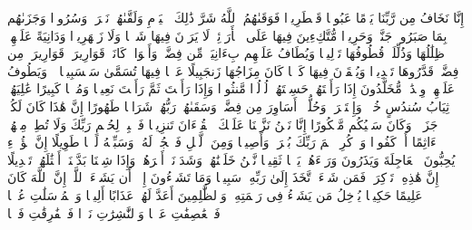 \startbuffer[\q:76:10]
إِنَّا نَخَافُ مِن رَّبِّنَا یَوۡمًا عَبُوسࣰا قَمۡطَرِیرࣰا%
\stopbuffer%
\startbuffer[\q:76:11]
فَوَقَىٰهُمُ ٱللَّهُ شَرَّ ذَٰلِكَ ٱلۡیَوۡمِ وَلَقَّىٰهُمۡ نَضۡرَةࣰ وَسُرُورࣰا%
\stopbuffer%
\startbuffer[\q:76:12]
وَجَزَىٰهُم بِمَا صَبَرُوا۟ جَنَّةࣰ وَحَرِیرࣰا%
\stopbuffer%
\startbuffer[\q:76:13]
مُّتَّكِءِینَ فِیهَا عَلَى ٱلۡأَرَاۤئِكِۖ لَا یَرَوۡنَ فِیهَا شَمۡسࣰا وَلَا زَمۡهَرِیرࣰا%
\stopbuffer%
\startbuffer[\q:76:14]
وَدَانِیَةً عَلَیۡهِمۡ ظِلَٰلُهَا وَذُلِّلَتۡ قُطُوفُهَا تَذۡلِیلࣰا%
\stopbuffer%
\startbuffer[\q:76:15]
وَیُطَافُ عَلَیۡهِم بِءَانِیَةࣲ مِّن فِضَّةࣲ وَأَكۡوَابࣲ كَانَتۡ قَوَارِیرَا۠%
\stopbuffer%
\startbuffer[\q:76:16]
قَوَارِیرَا۟ مِن فِضَّةࣲ قَدَّرُوهَا تَقۡدِیرࣰا%
\stopbuffer%
\startbuffer[\q:76:17]
وَیُسۡقَوۡنَ فِیهَا كَأۡسࣰا كَانَ مِزَاجُهَا زَنجَبِیلًا%
\stopbuffer%
\startbuffer[\q:76:18]
عَیۡنࣰا فِیهَا تُسَمَّىٰ سَلۡسَبِیلࣰا%
\stopbuffer%
\startbuffer[\q:76:19]
۞ وَیَطُوفُ عَلَیۡهِمۡ وِلۡدَٰنࣱ مُّخَلَّدُونَ إِذَا رَأَیۡتَهُمۡ حَسِبۡتَهُمۡ لُؤۡلُؤࣰا مَّنثُورࣰا%
\stopbuffer%
\startbuffer[\q:76:20]
وَإِذَا رَأَیۡتَ ثَمَّ رَأَیۡتَ نَعِیمࣰا وَمُلۡكࣰا كَبِیرًا%
\stopbuffer%
\startbuffer[\q:76:21]
عَٰلِیَهُمۡ ثِیَابُ سُندُسٍ خُضۡرࣱ وَإِسۡتَبۡرَقࣱۖ وَحُلُّوۤا۟ أَسَاوِرَ مِن فِضَّةࣲ وَسَقَىٰهُمۡ رَبُّهُمۡ شَرَابࣰا طَهُورًا%
\stopbuffer%
\startbuffer[\q:76:22]
إِنَّ هَٰذَا كَانَ لَكُمۡ جَزَاۤءࣰ وَكَانَ سَعۡیُكُم مَّشۡكُورًا%
\stopbuffer%
\startbuffer[\q:76:23]
إِنَّا نَحۡنُ نَزَّلۡنَا عَلَیۡكَ ٱلۡقُرۡءَانَ تَنزِیلࣰا%
\stopbuffer%
\startbuffer[\q:76:24]
فَٱصۡبِرۡ لِحُكۡمِ رَبِّكَ وَلَا تُطِعۡ مِنۡهُمۡ ءَاثِمًا أَوۡ كَفُورࣰا%
\stopbuffer%
\startbuffer[\q:76:25]
وَٱذۡكُرِ ٱسۡمَ رَبِّكَ بُكۡرَةࣰ وَأَصِیلࣰا%
\stopbuffer%
\startbuffer[\q:76:26]
وَمِنَ ٱلَّیۡلِ فَٱسۡجُدۡ لَهُۥ وَسَبِّحۡهُ لَیۡلࣰا طَوِیلًا%
\stopbuffer%
\startbuffer[\q:76:27]
إِنَّ هَٰۤؤُلَاۤءِ یُحِبُّونَ ٱلۡعَاجِلَةَ وَیَذَرُونَ وَرَاۤءَهُمۡ یَوۡمࣰا ثَقِیلࣰا%
\stopbuffer%
\startbuffer[\q:76:28]
نَّحۡنُ خَلَقۡنَٰهُمۡ وَشَدَدۡنَاۤ أَسۡرَهُمۡۖ وَإِذَا شِئۡنَا بَدَّلۡنَاۤ أَمۡثَٰلَهُمۡ تَبۡدِیلًا%
\stopbuffer%
\startbuffer[\q:76:29]
إِنَّ هَٰذِهِۦ تَذۡكِرَةࣱۖ فَمَن شَاۤءَ ٱتَّخَذَ إِلَىٰ رَبِّهِۦ سَبِیلࣰا%
\stopbuffer%
\startbuffer[\q:76:30]
وَمَا تَشَاۤءُونَ إِلَّاۤ أَن یَشَاۤءَ ٱللَّهُۚ إِنَّ ٱللَّهَ كَانَ عَلِیمًا حَكِیمࣰا%
\stopbuffer%
\startbuffer[\q:76:31]
یُدۡخِلُ مَن یَشَاۤءُ فِی رَحۡمَتِهِۦۚ وَٱلظَّٰلِمِینَ أَعَدَّ لَهُمۡ عَذَابًا أَلِیمَۢا%
\stopbuffer%
\startbuffer[\q:77:1]
وَٱلۡمُرۡسَلَٰتِ عُرۡفࣰا%
\stopbuffer%
\startbuffer[\q:77:2]
فَٱلۡعَٰصِفَٰتِ عَصۡفࣰا%
\stopbuffer%
\startbuffer[\q:77:3]
وَٱلنَّٰشِرَٰتِ نَشۡرࣰا%
\stopbuffer%
\startbuffer[\q:77:4]
فَٱلۡفَٰرِقَٰتِ فَرۡقࣰا%
